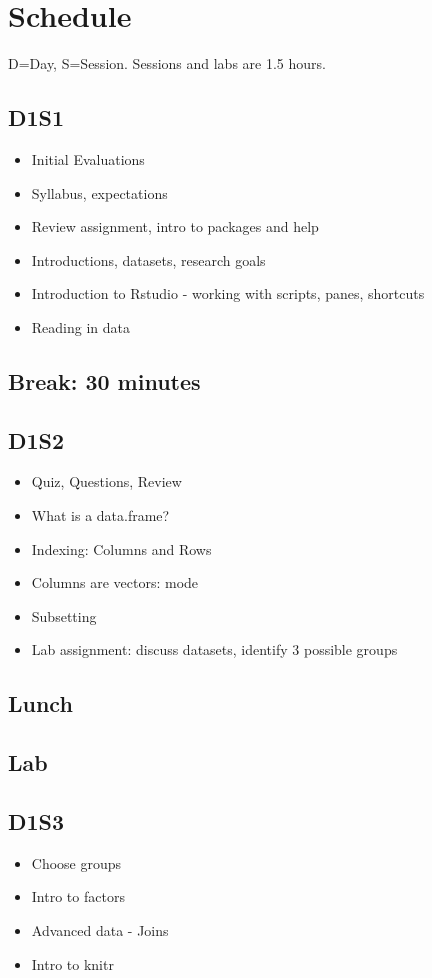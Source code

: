 \documentclass[english, letterpaper, 12pt]{article}
\begin{document}
\clearpage

\section*{Schedule}
D=Day, S=Session.  Sessions and labs are 1.5 hours.
\vspace{-5mm}
\subsection*{D1S1}
\begin{itemize}
    \item  Initial Evaluations
    \item  Syllabus, expectations
    \item  Review assignment, intro to packages and help
    \item  Introductions, datasets, research goals
    \item  Introduction to Rstudio - working with scripts, panes, shortcuts
    \item  Reading in data
\end{itemize}
\subsection*{Break: 30 minutes}
\subsection*{D1S2}
\begin{itemize}
    \item  Quiz, Questions, Review
    \item  What is a data.frame?
    \item  Indexing: Columns and Rows
    \item  Columns are vectors: mode 
    \item  Subsetting
    \item  Lab assignment: discuss datasets, identify 3 possible groups
\end{itemize}
\subsection*{Lunch}
\subsection*{Lab}
\subsection*{D1S3}
\begin{itemize}
    \item Choose groups
    \item Intro to factors
    \item Advanced data - Joins
    \item Intro to knitr
\end{itemize}
\end{document}
